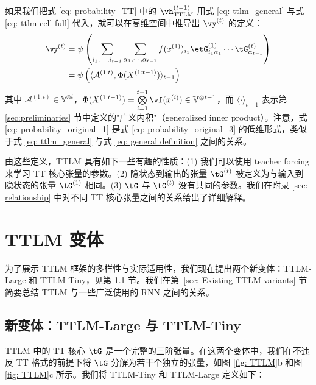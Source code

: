 \documentclass{article}
\theoremstyle{plain}
\theoremstyle{definition}
\theoremstyle{remark}
\begin{document}
如果我们把式 \ref{eq: probability_TT} 中的 $\vh^{(t-1)}_{\textrm{TTLM}}$ 用式 \ref{eq: ttlm_general} 与式 \ref{eq: ttlm cell full} 代入，就可以在高维空间中推导出 $\vy^{(t)}$ 的定义：
%
\begin{align} \small
      \vy^{(t)} &= \psi \left( \sum_{i_1, \cdots, i_{t-1}} \sum_{\alpha_1,\cdots, \alpha_{t-1}} f(x^{(1)})_{i_1}\etG^{(1)}_{i_1\alpha_1} \cdots \tG^{(t)}_{\alpha_{t-1}}  \right) \label{eq: probability_original_1} \\
    &=  \psi \left(\langle \mathcal{A}^{(1:t)}, \Phi(X^{(1: t-1)}) \rangle_{t-1} \right)  \label{eq: probability_original_3}
\end{align}
%
其中 $\mathcal{A}^{(1:t)}\in \mathbb{V}^{\otimes t}$，$\Phi(X^{(1: t-1)}) = \bigotimes\limits^{t-1}_{i=1}  \vf(x^{(i)}) \in \mathbb{V}^{\otimes t-1}$，而 $\langle \cdot \rangle_{t-1}$ 表示第 \ref{sec:preliminaries} 节中定义的"广义内积"（generalized inner product）。注意，式 \ref{eq: probability_original_1} 是式 \ref{eq: probability_original_3} 的低维形式，类似于式 \ref{eq: ttlm_general} 与式 \ref{eq: general definition} 之间的关系。




由这些定义，TTLM 具有如下一些有趣的性质：(1) 我们可以使用 teacher forcing \citep{marcus1998rethinking} 来学习 TT 核心张量的参数。(2) 隐状态到输出的张量 $\tG^{(t)}$ 被定义为与输入到隐状态的张量 $\tG^{(1)}$ 相同。(3) $\tG$ 与 $\tG^{(t)}$ 没有共同的参数。我们在附录 \ref{sec: relationship} 中对不同 TT 核心张量之间的关系给出了详细解释。
\section{TTLM 变体}

为了展示 TTLM 框架的多样性与实际适用性，我们现在提出两个新变体：TTLM-Large 和 TTLM-Tiny，见第 \ref{sec: Tinyttlm} 节。我们在第\ \ref{sec: Existing  TTLM variants} 节简要总结 TTLM 与一些广泛使用的 RNN 之间的关系。

\subsection{新变体：TTLM-Large 与 TTLM-Tiny}
\label{sec: Tinyttlm}

TTLM 中的 TT 核心 $\tG$ 是一个完整的三阶张量。在这两个变体中，我们在不违反 TT 格式的前提下将 $\tG$ 分解为若干个独立的张量，如图 \ref{fig: TTLM}b 和图 \ref{fig: TTLM}c 所示。我们将 TTLM-Tiny 和 TTLM-Large 定义如下：
\end{document}
